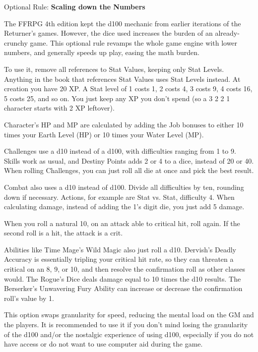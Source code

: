 \begin{multiboco}
Optional Rule: \textbf{Scaling down the Numbers}\label{optrule:scaling}\pc%

The FFRPG 4th edition kept the d100 mechanic from earlier iterations of the Returner’s games. However, the dice used increases the burden of an already-crunchy game. This optional rule revamps the whole game engine with lower numbers, and generally speeds up play, easing the math burden.

To use it, remove all references to Stat Values, keeping only Stat Levels. Anything in the book that references Stat Values uses Stat Levels instead. At creation you have 20 XP\@. A Stat level of 1 costs 1, 2 costs 4, 3 costs 9, 4 costs 16, 5 costs 25, and so on. You just keep any XP you don't spend (so a 3 2 2 1 character starts with 2 XP leftover).

Character’s HP and MP are calculated by adding the Job bonuses to either 10 times your Earth Level (HP) or 10 times your Water Level (MP).

Challenges use a d10 instead of a d100, with difficulties ranging from 1 to 9. Skills work as usual, and Destiny Points adds 2 or 4 to a dice, instead of 20 or 40. When rolling Challenges, you can just roll all die at once and pick the best result.

Combat also uses a d10 instead of d100. Divide all difficulties by ten, rounding down if necessary.  Actions, for example are Stat vs. Stat, difficulty 4. When calculating damage, instead of adding the 1's digit die, you just add 5 damage.

When you roll a natural 10, on an attack able to critical hit, roll again. If the second roll is a hit, the attack is a crit.

Abilities like Time Mage’s Wild Magic also just roll a d10. Dervish's Deadly Accuracy is essentially tripling your critical hit rate, so they can threaten a critical on an 8, 9, or 10, and then resolve the confirmation roll as other classes would. The Rogue’s Dice deals damage equal to 10 times the d10 results. The Berserker’s Unwavering Fury Ability can increase or decrease the confirmation roll’s value by 1.

This option swaps granularity for speed, reducing the mental load on the GM and the players. It is recommended to use it if you don’t mind losing the granularity of the d100 and/or the nostalgic experience of using d100, especially if you do not have access or do not want to use computer aid during the game.
\end{multiboco}